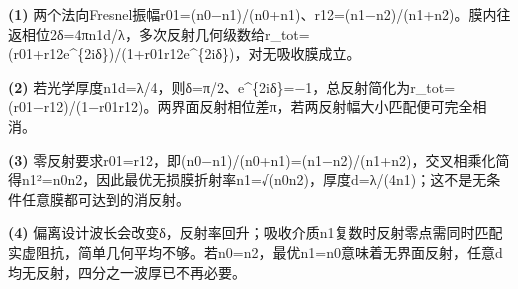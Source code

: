 \par\noindent\textbf{(1)} 两个法向Fresnel振幅r01=(n0−n1)/(n0+n1)、r12=(n1−n2)/(n1+n2)。膜内往返相位2δ=4πn1d/λ，多次反射几何级数给r\_tot=(r01+r12e\textasciicircum{}\{2iδ\})/(1+r01r12e\textasciicircum{}\{2iδ\})，对无吸收膜成立。
\par\noindent\textbf{(2)} 若光学厚度n1d=λ/4，则δ=π/2、e\textasciicircum{}\{2iδ\}=−1，总反射简化为r\_tot=(r01−r12)/(1−r01r12)。两界面反射相位差π，若两反射幅大小匹配便可完全相消。
\par\noindent\textbf{(3)} 零反射要求r01=r12，即(n0−n1)/(n0+n1)=(n1−n2)/(n1+n2)，交叉相乘化简得n1²=n0n2，因此最优无损膜折射率n1=√(n0n2)，厚度d=λ/(4n1)；这不是无条件任意膜都可达到的消反射。
\par\noindent\textbf{(4)} 偏离设计波长会改变δ，反射率回升；吸收介质n1复数时反射零点需同时匹配实虚阻抗，简单几何平均不够。若n0=n2，最优n1=n0意味着无界面反射，任意d均无反射，四分之一波厚已不再必要。
